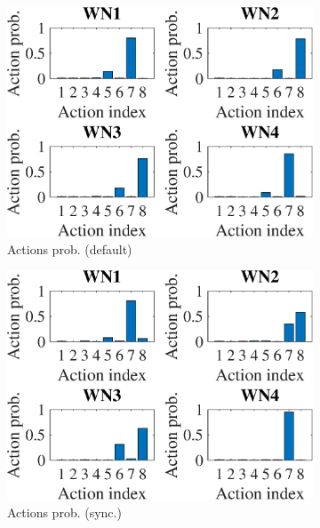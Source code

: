 \documentclass[preprint,12pt]{article}
\begin{document}
\begin{figure}[h!]
	\centering
	\begin{subfigure}[b]{.3\textwidth}
		\includegraphics[width=\textwidth]{images/actions_probability_EG}
		\caption{Actions prob. (default)}\label{fig:actions_probability_EG}
	\end{subfigure}
	\begin{subfigure}[b]{.3\textwidth}
		\includegraphics[width=\textwidth]{images/actions_probability_OEG}
		\caption{Actions prob. (sync.)}\label{fig:actions_probability_OEG}
	\end{subfigure}
	\begin{subfigure}[b]{.3\textwidth}

\end{subfigure}
\end{figure}
\end{document}
